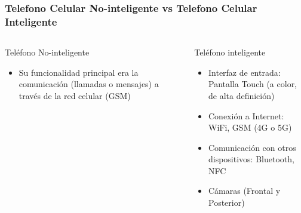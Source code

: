 \begin{frame}
\frametitle{Telefono Celular No-inteligente vs Telefono Celular Inteligente}  

\begin{columns}
\begin{block}{Tel\'efono No-inteligente}
\begin{itemize}
\item Su funcionalidad principal era la comunicaci\'on (llamadas o mensajes) a trav\'es de la red celular (GSM)
\end{itemize}
\end{block}
\begin{block}{Tel\'efono inteligente}
\begin{itemize}
\item Interfaz de entrada: Pantalla Touch (a color, de alta definici\'on) 
\item Conexi\'on a Internet: WiFi, GSM (4G o 5G)
\item Comunicaci\'on con otros dispositivos: Bluetooth, NFC
\item C\'amaras (Frontal y Posterior)
\end{itemize}
\end{block}


\end{columns}
\end{frame}
